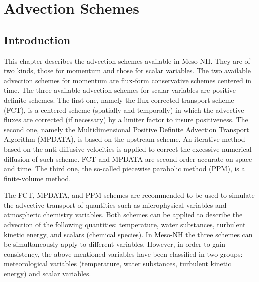 %
%

\chapter{Advection Schemes}
\minitoc


\section{Introduction}

This chapter describes the advection schemes available in Meso-NH.
 They are of two kinds, those for momentum and those for scalar variables. 
The two available advection schemes for momentum are flux-form conservative 
schemes centered in time. The three available advection schemes for scalar 
variables are positive definite schemes.  The first one, namely the 
flux-corrected transport scheme (FCT), is a centered scheme (spatially 
and temporally) in which the advective fluxes are corrected (if necessary)
by a limiter factor to insure positiveness.
The second one, namely the Multidimensional Positive Definite Advection 
Transport  Algorithm (MPDATA), is based on the upstream scheme. 
An iterative method  based on the anti diffusive velocities is applied 
to correct the excessive  numerical diffusion of such scheme. 
FCT and MPDATA are second-order accurate on space and time.
The third one, the so-called piecewise parabolic method 
(PPM), is a finite-volume method.

The FCT, MPDATA, and PPM schemes are recommended to be used to simulate
the advective transport of quantities such as microphysical variables
and atmospheric chemistry variables. Both schemes can be applied to describe
the advection of the following quantities: temperature, water substances,
turbulent kinetic energy, and scalars (chemical species). 
In Meso-NH the three schemes can be simultaneously apply to
different variables. However, in order to gain consistency, the above 
mentioned variables have been classified in two groups: meteorological 
variables (temperature, water substances, turbulent kinetic energy) and
scalar variables.

